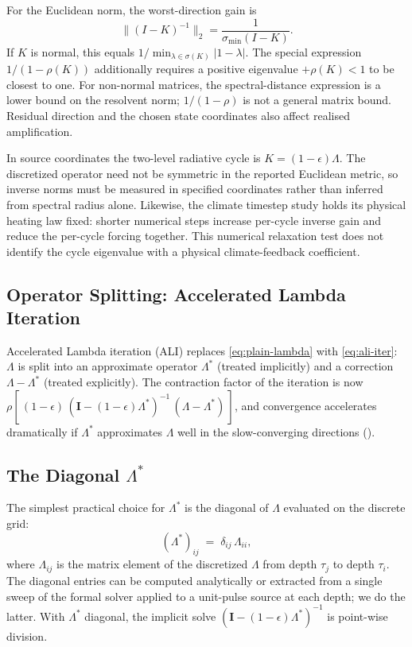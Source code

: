 \documentclass[11pt]{article}
\newcommand{\Lop}{\Lambda}
\newcommand{\Lstar}{\Lambda^{*}}
\begin{document}
For the Euclidean norm, the worst-direction gain is
\begin{equation}
\|(I-K)^{-1}\|_2=\frac{1}{\sigma_{\min}(I-K)}.
\end{equation}
If $K$ is normal, this equals
$1/\min_{\lambda\in\sigma(K)}|1-\lambda|$.
The special expression $1/(1-\rho(K))$ additionally requires a positive
eigenvalue $+\rho(K)<1$ to be closest to one. For non-normal matrices,
the spectral-distance expression is a lower bound on the resolvent norm;
$1/(1-\rho)$ is not a general matrix bound. Residual direction and the
chosen state coordinates also affect realised amplification.

In source coordinates the two-level radiative cycle is
$K=(1-\epsilon)\Lambda$. The discretized operator need not be symmetric
in the reported Euclidean metric, so inverse norms must be measured in
specified coordinates rather than inferred from spectral radius alone.
Likewise, the climate timestep study holds its physical heating law fixed:
shorter numerical steps increase per-cycle inverse gain and reduce the
per-cycle forcing together. This numerical relaxation test does not identify
the cycle eigenvalue with a physical climate-feedback coefficient.

\subsection{Operator Splitting: Accelerated Lambda Iteration}
\label{sec:ali}

Accelerated Lambda iteration (ALI) replaces \eqref{eq:plain-lambda}
with \eqref{eq:ali-iter}: $\Lop$ is split into an approximate
operator $\Lstar$ (treated implicitly) and a correction
$\Lop - \Lstar$ (treated explicitly).  The contraction factor of the
iteration is now
$\rho\!\left[\,(1-\epsilon)\,(\mathbf{I} - (1-\epsilon)\Lstar)^{-1}\,(\Lop - \Lstar)\,\right]$,
and convergence accelerates dramatically if $\Lstar$ approximates
$\Lop$ well in the slow-converging directions
(\citep{OlsonAuerBuchler1986}).

\subsection{The Diagonal $\Lstar$}

The simplest practical choice for $\Lstar$ is the diagonal of $\Lop$
evaluated on the discrete grid:
\begin{equation}
(\Lstar)_{ij} \;=\; \delta_{ij}\,\Lop_{ii} ,
\label{eq:diag-Lstar}
\end{equation}
where $\Lop_{ij}$ is the matrix element of the discretized $\Lop$ from
depth $\tau_j$ to depth $\tau_i$.  The diagonal entries can be computed
analytically or extracted from a single sweep of the formal solver
applied to a unit-pulse source at each depth; we do the latter.  With
$\Lstar$ diagonal, the implicit solve
$(\mathbf{I} - (1-\epsilon)\Lstar)^{-1}$ is point-wise division.
\end{document}
